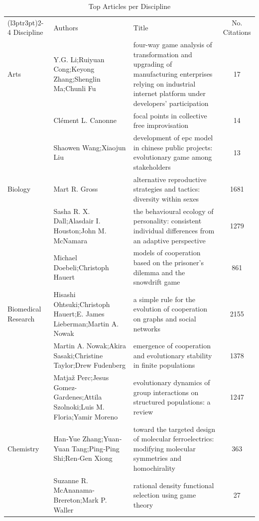 \documentclass[
  12pt,
]{article}
\begin{document}
\begin{longtable}[t]{|>{\raggedright\arraybackslash}p{4cm}>{\raggedright\arraybackslash}p{4cm}>{\raggedright\arraybackslash}p{4cm}>{}c|}
\caption{\label{tab:top_articles_per_discipline}Top Articles per Discipline}\\
\toprule
\multicolumn{1}{c}{ } & \multicolumn{3}{c}{Top Articles per Discipline (Descending Order)} \\
\cmidrule(l{3pt}r{3pt}){2-4}
Discipline & Authors & Title & No. Citations\\
\midrule
Arts & Y.G. Li;Ruiyuan Cong;Keyong Zhang;Shenglin Ma;Chunli Fu & four-way game analysis of transformation and upgrading of manufacturing enterprises relying on industrial internet platform under developers’ participation & 17\\
 & Clément L. Canonne & focal points in collective free improvisation & 14\\
 & Shaowen Wang;Xiaojun Liu & development of epc model in chinese public projects: evolutionary game among stakeholders & 13\\
Biology & Mart R. Gross & alternative reproductive strategies and tactics: diversity within sexes & 1681\\
 & Sasha R. X. Dall;Alasdair I. Houston;John M. McNamara & the behavioural ecology of personality: consistent individual differences from an adaptive perspective & 1279\\
 & Michael Doebeli;Christoph Hauert & models of cooperation based on the prisoner's dilemma and the snowdrift game & 861\\
Biomedical Research & Hisashi Ohtsuki;Christoph Hauert;E. James Lieberman;Martin A. Nowak & a simple rule for the evolution of cooperation on graphs and social networks & 2155\\
 & Martin A. Nowak;Akira Sasaki;Christine Taylor;Drew Fudenberg & emergence of cooperation and evolutionary stability in finite populations & 1378\\
 & Matjaž Perc;Jesus Gomez- Gardenes;Attila Szolnoki;Luis M. Floria;Yamir Moreno & evolutionary dynamics of group interactions on structured populations: a review & 1247\\
Chemistry & Han‐Yue Zhang;Yuan‐Yuan Tang;Ping‐Ping Shi;Ren‐Gen Xiong & toward the targeted design of molecular ferroelectrics: modifying molecular symmetries and homochirality & 363\\
 & Suzanne R. McAnanama-Brereton;Mark P. Waller & rational density functional selection using game theory & 27\\

\end{longtable}
\end{document}
